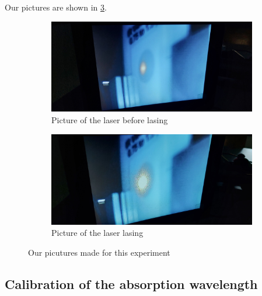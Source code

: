 Our pictures are shown in \ref{fig:lasing}.
\begin{figure}
    \centering
    \begin{subfigure}[t]{0.3\textwidth}
        \centering
        \includegraphics[width=\textwidth]{images/photo_not_lasing.jpg}
        \caption{Picture of the laser before lasing}
        \label{fig:notlase}
    \end{subfigure}
    \begin{subfigure}[t]{0.3\textwidth}
        \centering
        \includegraphics[width=\textwidth]{images/photo_lasing.jpg}
        \caption{Picture of the laser lasing}
        \label{fig:lase}
    \end{subfigure}
    \caption{Our picutures made for this experiment}
    \label{fig:lasing}
\end{figure}

\subsection{Calibration of the absorption wavelength}
\label{ssec:exe2}

